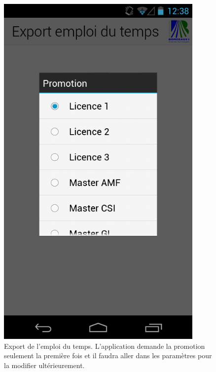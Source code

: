 \documentclass [pdftex,12pt] {report}
\begin{document}
\begin{figure}
  \begin{minipage}[t]{8cm}
    \centering
    \includegraphics[width=0.9\textwidth]{resources/ui_preview/07}
    \caption{Export de l'emploi du temps. L'application demande la promotion seulement la première fois et il faudra aller dans les paramètres pour la modifier ultérieurement. }
    \label{fig:07}
  \end{minipage}
  \begin{minipage}[t]{8cm}
    \centering

\end{minipage}
\end{figure}
\end{document}
